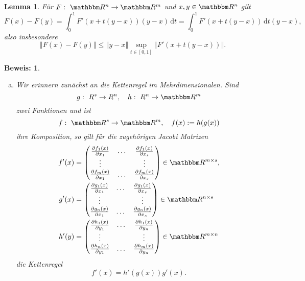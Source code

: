 \documentclass[12pt,a4paper]{book}
\theoremstyle{break}
\newtheorem{lemma}[theorem]{Lemma}
\theoremstyle{nonumberplain}
\newtheorem{beweis}{Beweis:}
\newcommand{\R}{\mathbbm R}
\newcommand{\norm}[1]{\left\Vert#1\right\Vert}		%
\newcommand{\1}{\mathbbm{1}} 			      	%
\newcommand{\dx}[1][x]{\ensuremath{\, \mathrm{d} #1}} 	%
\begin{document}
\begin{appendix}
\begin{lemma}
Für $F:\ \R^n\to \R^m$ und $x,y\in \R^n$ gilt
\[
F(x)-F(y)=\int_0^1 F'(x+t(y-x))(y-x)\dx[t]=\int_0^1 F'(x+t(y-x))\dx[t](y-x),
\]
also insbesondere
\[
\norm{F(x)-F(y)}\leq \norm{y-x} \sup_{t\in [0,1]} \norm{F'(x+t(y-x))}.
\]
\end{lemma}
\begin{beweis}
\begin{enumerate}[(a)]
\item
Wir erinnern zunächst an die Kettenregel im Mehrdimensionalen. Sind 
\[
g:\ R^s\to R^n, \quad h:\ R^n\to \R^m
\]
zwei Funktionen und ist
\[
f:\ \R^s\to \R^m,\quad f(x):=h(g(x))
\]
ihre Komposition, so gilt für die zugehörigen Jacobi Matrizen
\begin{align*}
f'(x)&=
\begin{pmatrix}
\frac{\partial f_1(x)}{\partial x_1} & \dots & \frac{\partial f_1(x)}{\partial x_s}\\
\vdots & & \vdots\\
\frac{\partial f_m(x)}{\partial x_1} & \dots & \frac{\partial f_m(x)}{\partial x_s}\\
\end{pmatrix}\in \R^{m\times s},\\
g'(x)&=
\begin{pmatrix}
\frac{\partial g_1(x)}{\partial x_1} & \dots & \frac{\partial g_1(x)}{\partial x_s}\\
\vdots & & \vdots\\
\frac{\partial g_n(x)}{\partial x_1} & \dots & \frac{\partial g_n(x)}{\partial x_s}\\
\end{pmatrix}\in \R^{n\times s}\\
h'(y)&=
\begin{pmatrix}
\frac{\partial h_1(x)}{\partial y_1} & \dots & \frac{\partial h_1(x)}{\partial y_n}\\
\vdots & & \vdots\\
\frac{\partial h_n(x)}{\partial y_1} & \dots & \frac{\partial h_m(x)}{\partial y_n}\\
\end{pmatrix}\in \R^{m\times n}
\end{align*}
die Kettenregel
\[
f'(x)=h'(g(x)) g'(x).
\]


\end{enumerate}
\end{beweis}
\end{appendix}
\end{document}
